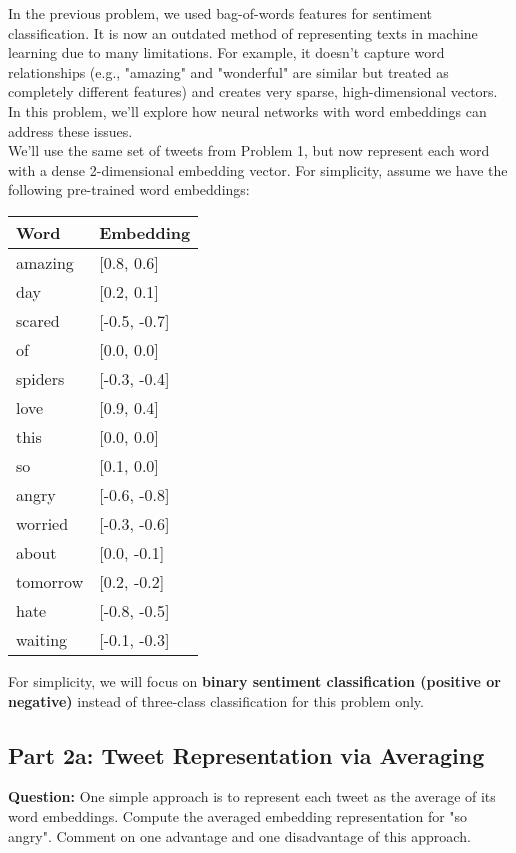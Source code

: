 \documentclass{article}
\theoremstyle{case}
\theoremstyle{definition}
\begin{document}
In the previous problem, we used bag-of-words features for sentiment classification. It is now an outdated method of representing texts in machine learning due to many limitations. For example, it doesn't capture word relationships (e.g., "amazing" and "wonderful" are similar but treated as completely different features) and creates very sparse, high-dimensional vectors. In this problem, we'll explore how neural networks with word embeddings can address these issues.\\

We'll use the same set of tweets from Problem 1, but now represent each word with a dense 2-dimensional embedding vector. For simplicity, assume we have the following pre-trained word embeddings:

\begin{table}[h]
\centering
\begin{tabular}{|l|l|}
\hline
Word & Embedding \\
\hline
amazing & [0.8, 0.6] \\
day & [0.2, 0.1] \\
scared & [-0.5, -0.7] \\
of & [0.0, 0.0] \\
spiders & [-0.3, -0.4] \\
love & [0.9, 0.4] \\
this & [0.0, 0.0] \\
so & [0.1, 0.0] \\
angry & [-0.6, -0.8] \\
worried & [-0.3, -0.6] \\
about & [0.0, -0.1] \\
tomorrow & [0.2, -0.2] \\
hate & [-0.8, -0.5] \\
waiting & [-0.1, -0.3] \\
\hline
\end{tabular}
\end{table}

For simplicity, we will focus on \textbf{binary sentiment classification (positive or negative)} instead of three-class classification for this problem only.


\subsection*{Part 2a: Tweet Representation via Averaging}

\textbf{Question:} One simple approach is to represent each tweet as the average of its word embeddings. Compute the averaged embedding representation for "so angry". Comment on one advantage and one disadvantage of this approach.
\end{document}
